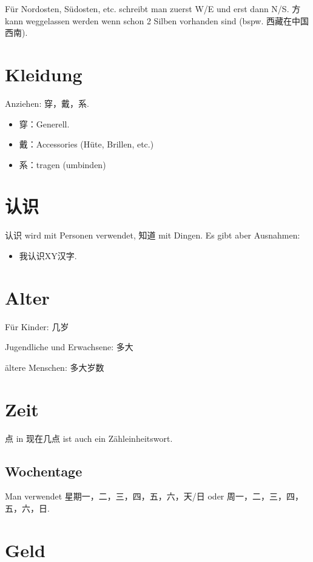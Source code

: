 \documentclass[UTF8]{ctexart}
\begin{document}
Für Nordosten, Südosten, etc. schreibt man zuerst W/E und erst dann N/S. 方 kann weggelassen werden wenn schon 2 Silben vorhanden sind (bspw. 西藏在中国西南).

\section{Kleidung}

Anziehen: 穿，戴，系.

\begin{itemize}
    \item 穿：Generell.
    \item 戴：Accessories (Hüte, Brillen, etc.)
    \item 系：tragen (umbinden)
\end{itemize}

\section{认识}

认识 wird mit Personen verwendet, 知道 mit Dingen. Es gibt aber Ausnahmen:

\begin{itemize}
    \item 我认识XY汉字.
\end{itemize}

\section{Alter}

Für Kinder: 几岁

Jugendliche und Erwachsene: 多大

ältere Menschen: 多大岁数


\section{Zeit}

点 in 现在几点 ist auch ein Zähleinheitswort.

\subsection{Wochentage}

Man verwendet 星期{一，二，三，四，五，六，天/日} oder 周{一，二，三，四，五，六，日}.

\section{Geld}
\end{document}
